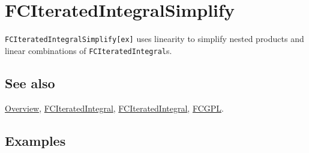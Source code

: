 \documentclass[../FeynCalcManual.tex]{subfiles}
\begin{document}
\hypertarget{fciteratedintegralsimplify}{
\section{FCIteratedIntegralSimplify}\label{fciteratedintegralsimplify}}

\texttt{FCIteratedIntegralSimplify[\allowbreak{}ex]} uses linearity to
simplify nested products and linear combinations of
\texttt{FCIteratedIntegral}s.

\subsection{See also}

\hyperlink{toc}{Overview},
\hyperlink{fciteratedintegral}{FCIteratedIntegral},
\hyperlink{fciteratedintegral}{FCIteratedIntegral},
\hyperlink{fcgpl}{FCGPL}.

\subsection{Examples}
\end{document}
